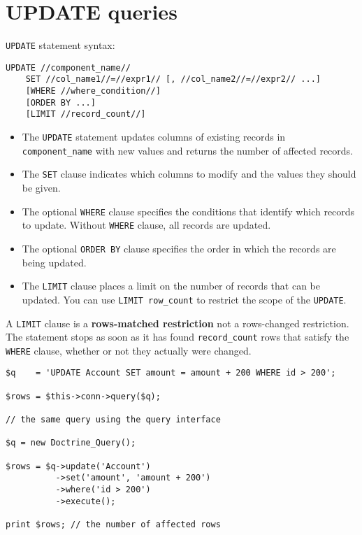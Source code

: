 \documentclass[11pt,a4paper]{report}
\begin{document}
\section{UPDATE queries}
\texttt{UPDATE} statement syntax:

\begin{verbatim}
UPDATE //component_name//
    SET //col_name1//=//expr1// [, //col_name2//=//expr2// ...]
    [WHERE //where_condition//]
    [ORDER BY ...]
    [LIMIT //record_count//]
\end{verbatim}

\begin{itemize}
\item{The \texttt{UPDATE} statement updates columns of existing records in \texttt{component\_name} with new values and returns the number of affected records.}
\item{The \texttt{SET} clause indicates which columns to modify and the values they should be given.}
\item{The optional \texttt{WHERE} clause specifies the conditions that identify which records to update. Without \texttt{WHERE} clause, all records are updated.}
\item{The optional \texttt{ORDER BY} clause specifies the order in which the records are being updated.}
\item{The \texttt{LIMIT} clause places a limit on the number of records that can be updated. You can use \texttt{LIMIT row\_count} to restrict the scope of the \texttt{UPDATE}.}
\end{itemize}
A \texttt{LIMIT} clause is a \textbf{rows-matched restriction} not a rows-changed restriction.\newline
The statement stops as soon as it has found \texttt{record\_count} rows that satisfy the \texttt{WHERE} clause, whether or not they actually were changed.

\begin{verbatim}
$q    = 'UPDATE Account SET amount = amount + 200 WHERE id > 200';

$rows = $this->conn->query($q);

// the same query using the query interface

$q = new Doctrine_Query();

$rows = $q->update('Account')
          ->set('amount', 'amount + 200')
          ->where('id > 200')
          ->execute();

print $rows; // the number of affected rows
\end{verbatim}
\end{document}
